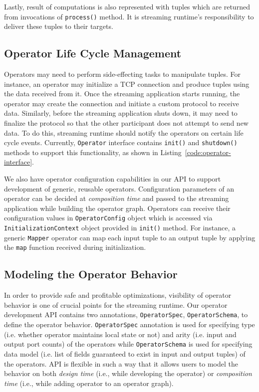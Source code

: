 Lastly, result of computations is also represented with tuples which are returned from invocations of \texttt{process()} method. It is streaming runtime's responsibility to deliver these tuples to their targets.

\subsection{Operator Life Cycle Management}\label{sec:operator-lifecycle}

Operators may need to perform side-effecting tasks to manipulate tuples. For instance, an operator may initialize a TCP connection and produce tuples using the data received from it. Once the streaming application starts running, the operator may create the connection and initiate a custom protocol to receive data. Similarly, before the streaming application shuts down, it may need to finalize the protocol so that the other participant does not attempt to send new data. To do this, streaming runtime should notify the operators on certain life cycle events. Currently, \texttt{Operator} interface contains \texttt{init()} and \texttt{shutdown()} methods to support this functionality, as shown in Listing~\ref{code:operator-interface}. 

We also have operator configuration capabilities in our API to support development of generic, reusable operators. Configuration parameters of an operator can be decided at \textit{composition time} and passed to the streaming application while building the operator graph. Operators can receive their configuration values in \texttt{OperatorConfig} object which is accessed via \texttt{InitializationContext} object provided in \texttt{init()} method. For instance, a generic \texttt{Mapper} operator can map each input tuple to an output tuple by applying the \texttt{map} function received during initialization.

\subsection{Modeling the Operator Behavior}\label{sec:operator-behavior}

In order to provide safe and profitable optimizations, visibility of operator behavior is one of crucial points for the streaming runtime. Our operator development API contains two annotations, \texttt{OperatorSpec}, \texttt{OperatorSchema}, to define the operator behavior. \texttt{OperatorSpec} annotation is used for specifying type (i.e. whether operator maintains local state or not) and arity (i.e. input and output port counts) of the operators while \texttt{OperatorSchema} is used for specifying data model (i.e. list of fields guaranteed to exist in input and output tuples) of the operators. API is flexible in such a way that it allows users to model the behavior on both \textit{design time} (i.e., while developing the operator) or \textit{composition time} (i.e., while adding operator to an operator graph). 

